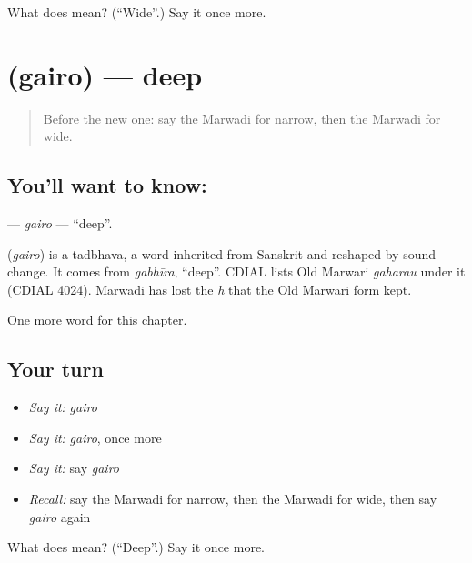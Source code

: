 \begin{tcolorbox}[breakable,colback=teal!4,colframe=teal!35!black,title={Before you move on}]
What does  mean? (\textquotedblleft{}Wide\textquotedblright{}.) Say it once more.
\end{tcolorbox}
\section[\texorpdfstring{\mw{गैरो} (gairo)}{गैरो (gairo)}]{ (gairo) — deep}

\label{lesson:MW-C141-gairo}



\begin{quote}
Before the new one: say the Marwadi for narrow, then the Marwadi for wide.
\end{quote}

\subsection*{You'll want to know: }
\textbf{} — \emph{gairo} — \textquotedblleft{}deep\textquotedblright{}.

\begin{cousinweb}
\textbf{} (\emph{gairo}) is a tadbhava, a word inherited from Sanskrit and reshaped by sound change. It comes from \emph{gabhīra}, \textquotedblleft{}deep\textquotedblright{}. CDIAL lists Old Marwari \emph{gaharau} under it (CDIAL 4024). Marwadi has lost the \emph{h} that the Old Marwari form kept.
\end{cousinweb}

\begin{grammarlens}[title={What you've built}]
One more word for this chapter.
\end{grammarlens}

\subsection*{Your turn}
\begin{itemize}
\raggedright
  \item \emph{Say it:} \emph{gairo}
  \item \emph{Say it:} \emph{gairo}, once more
  \item \emph{Say it:} say \emph{gairo}
  \item \emph{Recall:} say the Marwadi for narrow, then the Marwadi for wide, then say \emph{gairo} again
\end{itemize}

\begin{tcolorbox}[breakable,colback=teal!4,colframe=teal!35!black,title={Before you move on}]
What does  mean? (\textquotedblleft{}Deep\textquotedblright{}.) Say it once more.
\end{tcolorbox}
